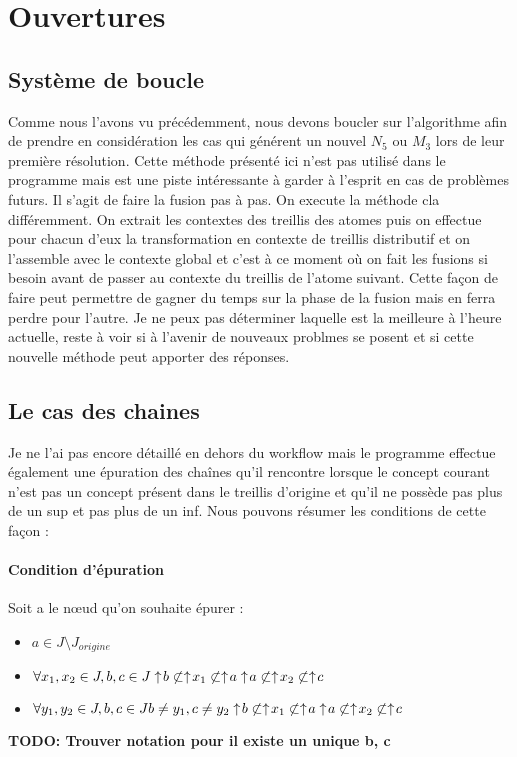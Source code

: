 \section{Ouvertures}

\subsection{Système de boucle}

Comme nous l'avons vu précédemment, nous devons boucler sur l'algorithme afin de prendre en considération les cas qui générent un nouvel $N_5$ ou $M_3$ lors de leur première résolution. Cette méthode présenté ici n'est pas utilisé dans le programme mais est une piste intéressante à garder à l'esprit en cas de problèmes futurs. Il s'agit de faire la fusion pas à pas. On execute la méthode cla différemment. On extrait les contextes des treillis des atomes puis on effectue pour chacun d'eux la transformation en contexte de treillis distributif et on l'assemble avec le contexte global et c'est à ce moment où on fait les fusions si besoin avant de passer au contexte du treillis de l'atome suivant. Cette façon de faire peut permettre de gagner du temps sur la phase de la fusion mais en ferra perdre pour l'autre. Je ne peux pas déterminer laquelle est la meilleure à l'heure actuelle, reste à voir si à l'avenir de nouveaux problmes se posent et si cette nouvelle méthode peut apporter des réponses.

\subsection{Le cas des chaines}

Je ne l'ai pas encore détaillé en dehors du workflow mais le programme effectue également une épuration des chaînes qu'il rencontre lorsque le concept courant n'est pas un concept présent dans le treillis d'origine et qu'il ne possède pas plus de un sup et pas plus de un inf. Nous pouvons résumer les conditions de cette façon :

\paragraph*{Condition d'épuration}
Soit a le n\oe ud qu'on souhaite épurer :
\begin{itemize}
	\item $ a \in J \setminus J_{origine}$
	\item $\forall x_1, x_2 \in J, b, c \in J\\
		\uparrow \! b \not \subset \uparrow \! x_1 \not \subset \uparrow \! a\\
		\uparrow \! a \not \subset \uparrow \! x_2 \not \subset \uparrow \! c$
	\item $\forall y_1, y_2 \in J, b, c \in J\\
		b \neq y_1, c \neq y_2\\
		\uparrow \! b \not \subset \uparrow \! x_1 \not \subset \uparrow \! a\\
		\uparrow \! a \not \subset \uparrow \! x_2 \not \subset \uparrow \! c$
\end{itemize}
{\bf TODO: Trouver notation pour il existe un unique b, c}
\smallbreak

